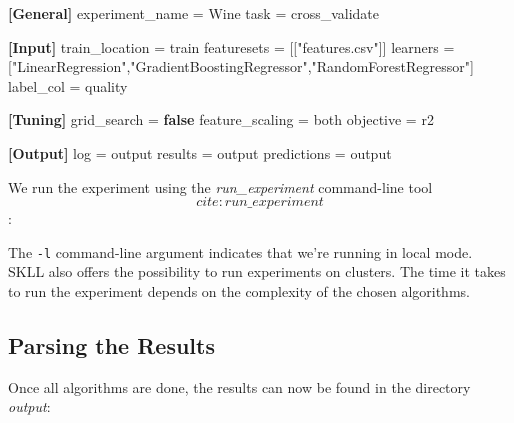 \documentclass[
]{book}
\newenvironment{Shaded}{\begin{snugshade}}{\end{snugshade}}
\newcommand{\DataTypeTok}[1]{\textcolor[rgb]{0.13,0.29,0.53}{#1}}
\newcommand{\ExtensionTok}[1]{#1}
\newcommand{\KeywordTok}[1]{\textcolor[rgb]{0.13,0.29,0.53}{\textbf{#1}}}
\newcommand{\NormalTok}[1]{#1}
\newcommand{\OtherTok}[1]{\textcolor[rgb]{0.56,0.35,0.01}{#1}}
\newcommand{\StringTok}[1]{\textcolor[rgb]{0.31,0.60,0.02}{#1}}
\theoremstyle{definition}
\theoremstyle{definition}
\theoremstyle{definition}
\theoremstyle{remark}
\begin{document}
\begin{Shaded}
\begin{Highlighting}[]
\KeywordTok{[General]}
\DataTypeTok{experiment_name }\OtherTok{=}\StringTok{ Wine}
\DataTypeTok{task }\OtherTok{=}\StringTok{ cross_validate}

\KeywordTok{[Input]}
\DataTypeTok{train_location }\OtherTok{=}\StringTok{ train}
\DataTypeTok{featuresets }\OtherTok{=}\StringTok{ [["features.csv"]]}
\DataTypeTok{learners }\OtherTok{=}\StringTok{ ["LinearRegression","GradientBoostingRegressor","RandomForestRegressor"]}
\DataTypeTok{label_col }\OtherTok{=}\StringTok{ quality}

\KeywordTok{[Tuning]}
\DataTypeTok{grid_search }\OtherTok{=}\StringTok{ }\KeywordTok{false}
\DataTypeTok{feature_scaling }\OtherTok{=}\StringTok{ both}
\DataTypeTok{objective }\OtherTok{=}\StringTok{ r2}

\KeywordTok{[Output]}
\DataTypeTok{log }\OtherTok{=}\StringTok{ output}
\DataTypeTok{results }\OtherTok{=}\StringTok{ output}
\DataTypeTok{predictions }\OtherTok{=}\StringTok{ output}
\end{Highlighting}
\end{Shaded}

We run the experiment using the \emph{run\_experiment} command-line tool \[cite:run\_experiment\]:

\begin{Shaded}
\end{Shaded}

The \texttt{-l} command-line argument indicates that we're running in local mode. SKLL also offers the possibility to run experiments on clusters. The time it takes to run the experiment depends on the complexity of the chosen algorithms.

\hypertarget{parsing-the-results}{%
\subsection{Parsing the Results}\label{parsing-the-results}}

Once all algorithms are done, the results can now be found in the directory \emph{output}:
\end{document}
